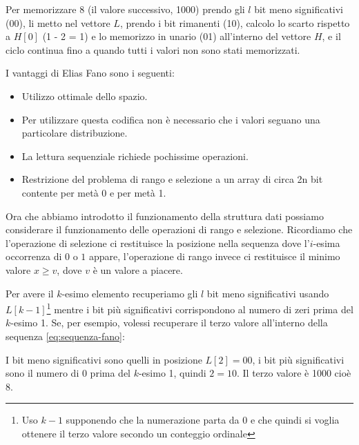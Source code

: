 Per memorizzare 8 (il valore successivo, 1000) prendo gli $l$ bit meno significativi (00), li metto nel vettore $L$, prendo i bit rimanenti (10), calcolo lo scarto rispetto a $H[0]$ (1 - 2 = 1) e lo memorizzo in unario (01) all'interno del vettore $H$, e il ciclo continua fino a quando tutti i valori non sono stati memorizzati.

I vantaggi di Elias Fano sono i seguenti:
\begin{itemize}
    \item Utilizzo ottimale dello spazio.
    \item Per utilizzare questa codifica non è necessario che i valori seguano una particolare distribuzione.
    \item La lettura sequenziale richiede pochissime operazioni.
    \item Restrizione del problema di rango e selezione a un array di circa 2n bit contente per metà 0 e per metà 1.
\end{itemize}
Ora che abbiamo introdotto il funzionamento della struttura dati possiamo considerare il funzionamento delle operazioni di rango e selezione. Ricordiamo che l'operazione di selezione ci restituisce la posizione nella sequenza dove l'$i$-esima occorrenza di $0$ o $1$ appare, l'operazione di rango invece ci restituisce il minimo valore $x \geq v$, dove $v$ è un valore a piacere.

Per avere il $k$-esimo elemento recuperiamo gli $l$ bit meno significativi usando $L[k - 1]$\footnote{Uso $k - 1$ supponendo che la numerazione parta da 0 e che quindi si voglia ottenere il terzo valore secondo un conteggio ordinale} mentre i bit più significativi corrispondono al numero di zeri prima del $k$-esimo 1. Se, per esempio, volessi recuperare il terzo valore all'interno della sequenza \ref{eq:sequenza-fano}:

I bit meno significativi sono quelli in posizione $L[2] = 00$, i bit più significativi sono il numero di 0 prima del $k$-esimo 1, quindi $2 = 10$. Il terzo valore è 1000 cioè $8$.

